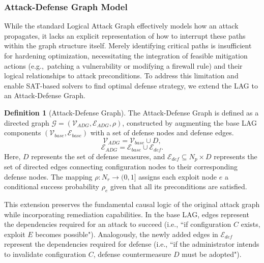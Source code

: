 \documentclass[conference]{IEEEtran}
\theoremstyle{definition} %
\newtheorem{definition}{Definition}
\theoremstyle{plain} %
\begin{document}
\subsubsection{Attack-Defense Graph Model}
\label{subsec:adg_model}

While the standard Logical Attack Graph effectively models how an attack propagates, it lacks an explicit representation of how to interrupt these paths within the graph structure itself. Merely identifying critical paths is insufficient for hardening optimization, necessitating the integration of feasible mitigation actions (e.g.,\ patching a vulnerability or modifying a firewall rule) and their logical relationships to attack preconditions. To address this limitation and enable SAT-based solvers to find optimal defense strategy, we extend the LAG to an Attack-Defense Graph.

{\color{red}
\begin{definition}[Attack-Defense Graph]
The Attack-Defense Graph is defined as a directed graph $\mathcal{G}=(\mathcal{V}_{ADG},\mathcal{E}_{ADG},\rho)$, constructed by augmenting the base LAG components $(\mathcal{V}_{base},\mathcal{E}_{base})$ with a set of defense nodes and defense edges.
\begin{equation}
    \mathcal{V}_{ADG}=\mathcal{V}_{base}\cup D,
\end{equation}
\begin{equation}
    \mathcal{E}_{ADG}=\mathcal{E}_{base}\cup\mathcal{E}_{def}.
\end{equation}
Here, $D$ represents the set of defense measures, and $\mathcal{E}_{def}\subseteq N_p\times D$ represents the set of directed edges connecting configuration nodes to their corresponding defense nodes. The mapping $\rho:N_r\rightarrow(0,1]$ assigns each exploit node $e$ a conditional success probability $\rho_e$ given that all its preconditions are satisfied.
\end{definition}
}

This extension preserves the fundamental causal logic of the original attack graph while incorporating remediation capabilities. In the base LAG, edges represent the dependencies required for an attack to succeed (i.e., ``if configuration $C$ exists, exploit $E$ becomes possible"). Analogously, the newly added edges in $\mathcal{E}_{def}$ represent the dependencies required for defense (i.e., ``if the administrator intends to invalidate configuration $C$, defense countermeasure $D$ must be adopted").
\end{document}
